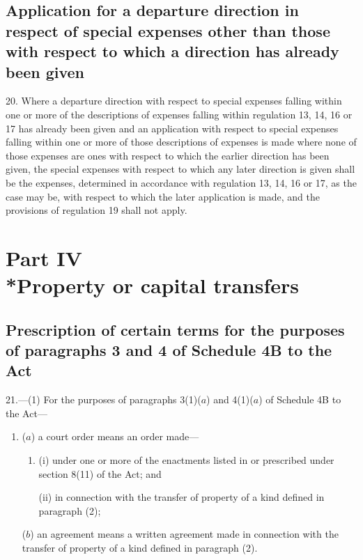 \documentclass[12pt,a4paper]{article}
\begin{document}
\subsection[20. Application for a departure direction in respect of special expenses other than
those with respect to which a direction has already been given]{Application for a departure direction in respect of special expenses other than
those with respect to which a direction has already been given}

20. Where a
departure direction with respect to special expenses falling within one or more
of the descriptions of expenses falling within regulation 13, 14, 16 or 17 has
already been given and an application with respect to special expenses falling
within one or more of those descriptions of expenses is made where none of those
expenses are ones with respect to which the earlier direction has been given,
the special expenses with respect to which any later direction is given shall be
the expenses, determined in accordance with regulation 13, 14, 16 or 17, as the
case may be, with respect to which the later application is made, and the
provisions of regulation 19 shall not apply.

\section[Part IV --- Property or capital transfers]{Part IV\\*Property or capital transfers}

\renewcommand\parthead{--- Part IV}

\subsection[21. Prescription of certain terms for the
purposes of paragraphs 3 and 4 of Schedule 4B to the Act]{Prescription of certain terms for the
purposes of paragraphs 3 and 4 of Schedule 4B to the Act}

21.—(1) For the purposes
of paragraphs 3(1)($a$) and 4(1)($a$) of Schedule 4B to the Act—
\begin{enumerate}\item[]
($a$) a court order means an order made—
\begin{enumerate}\item[]
(i) under one or more of the enactments listed in or prescribed under section
8(11) of the Act; and

(ii) in connection with the transfer of property of a kind defined in paragraph
(2);
\end{enumerate}

($b$) an agreement means a written agreement made in connection with the transfer
of property of a kind defined in paragraph (2).
\end{enumerate}
\end{document}
